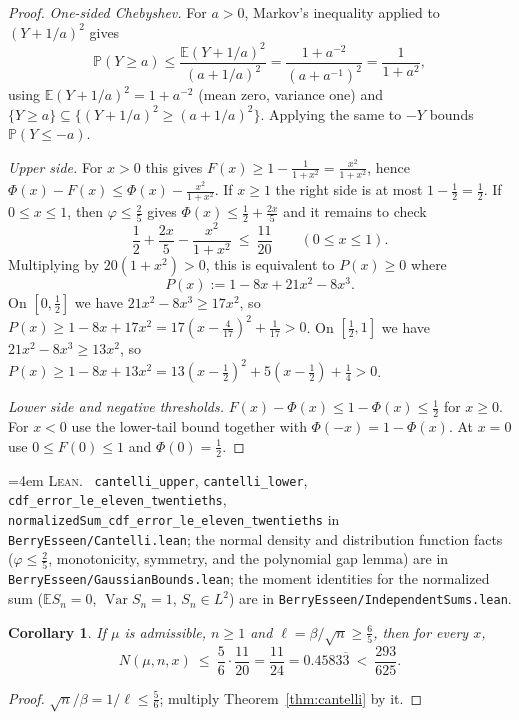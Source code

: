 \documentclass[10pt,a4paper]{article}
\theoremstyle{plain}
\newtheorem{corollary}[theorem]{Corollary}
\theoremstyle{definition}
\newcommand{\E}{\mathbb{E}}
\newcommand{\PR}{\mathbb{P}}
\newcommand{\lean}[1]{\texttt{#1}}
\newcommand{\file}[1]{\texttt{#1}}
\newenvironment{leanref}%
  {\par\addvspace{3pt}\begingroup\sloppy\emergencystretch=4em
   \noindent\footnotesize\textsc{Lean.}\ \ignorespaces}%
  {\par\endgroup\addvspace{3pt}}
\begin{document}
\begin{proof}
\emph{One-sided Chebyshev.} For $a>0$, Markov's inequality applied to
$(Y+1/a)^2$ gives
\[
  \PR(Y\ge a) \le \frac{\E(Y+1/a)^2}{(a+1/a)^2}
  = \frac{1+a^{-2}}{(a+a^{-1})^2} = \frac1{1+a^2},
\]
using $\E(Y+1/a)^2=1+a^{-2}$ (mean zero, variance one) and
$\{Y\ge a\}\subseteq\{(Y+1/a)^2\ge(a+1/a)^2\}$. Applying the same to $-Y$
bounds $\PR(Y\le-a)$.

\emph{Upper side.} For $x>0$ this gives $F(x)\ge1-\tfrac1{1+x^2}
=\tfrac{x^2}{1+x^2}$, hence
$\Phi(x)-F(x)\le\Phi(x)-\tfrac{x^2}{1+x^2}$. If $x\ge1$ the right side is at
most $1-\tfrac12=\tfrac12$. If $0\le x\le1$, then $\varphi\le\tfrac25$ gives
$\Phi(x)\le\tfrac12+\tfrac{2x}{5}$ and it remains to check
\[
  \frac12+\frac{2x}{5}-\frac{x^2}{1+x^2}\ \le\ \frac{11}{20}
  \qquad (0\le x\le1).
\]
Multiplying by $20(1+x^2)>0$, this is equivalent to $P(x)\ge0$ where
\[
  P(x) := 1-8x+21x^2-8x^3 .
\]
On $[0,\tfrac12]$ we have $21x^2-8x^3\ge17x^2$, so
$P(x)\ge1-8x+17x^2=17(x-\tfrac4{17})^2+\tfrac1{17}>0$. On $[\tfrac12,1]$ we
have $21x^2-8x^3\ge13x^2$, so
$P(x)\ge1-8x+13x^2=13(x-\tfrac12)^2+5(x-\tfrac12)+\tfrac14>0$.

\emph{Lower side and negative thresholds.} $F(x)-\Phi(x)\le1-\Phi(x)\le\tfrac12$
for $x\ge0$. For $x<0$ use the lower-tail bound together with
$\Phi(-x)=1-\Phi(x)$. At $x=0$ use $0\le F(0)\le1$ and $\Phi(0)=\tfrac12$.
\end{proof}

\begin{leanref}
\lean{cantelli\_upper}, \lean{cantelli\_lower},
\lean{cdf\_error\_le\_eleven\_twentieths},
\lean{normalizedSum\_cdf\_error\_le\_eleven\_twentieths} in
\file{BerryEsseen/Cantelli.lean}; the normal density and distribution function
facts ($\varphi\le\tfrac25$, monotonicity, symmetry, and the polynomial gap
lemma) are in \file{BerryEsseen/GaussianBounds.lean}; the moment identities for
the normalized sum ($\E S_n=0$, $\operatorname{Var}S_n=1$, $S_n\in L^2$) are in
\file{BerryEsseen/IndependentSums.lean}.
\end{leanref}

\begin{corollary}\label{cor:large}
If $\mu$ is admissible, $n\ge1$ and $\ell=\beta/\sqrt n\ge\tfrac65$, then for
every $x$,
\[
  N(\mu,n,x) \ \le\ \frac{5}{6}\cdot\frac{11}{20} = \frac{11}{24}
  = 0.4583\overline{3} \ <\ \frac{293}{625}.
\]
\end{corollary}

\begin{proof}
$\sqrt n/\beta=1/\ell\le\tfrac56$; multiply Theorem~\ref{thm:cantelli}
by it.
\end{proof}
\end{document}
